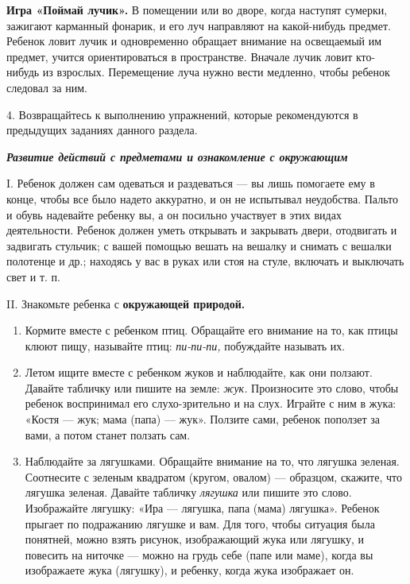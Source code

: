 \documentclass[a5paper]{book}
\renewcommand{\emph}[1]{\textit{#1}}
\begin{document}
\textbf{Игра «Поймай лучик».} В помещении или во дворе, когда наступят
сумерки, зажигают карманный фонарик, и его луч направляют на
какой-нибудь предмет. Ребенок ловит лучик и одновременно обращает
внимание на освещаемый им предмет, учится ориентироваться в
пространстве. Вначале лучик ловит кто-нибудь из взрослых. Перемещение
луча нужно вести медленно, чтобы ребенок следовал за ним.

4. Возвращайтесь к выполнению упражнений, которые рекомендуются в
предыдущих заданиях данного раздела.

\emph{\textbf{Развитие действий с предметами и ознакомление с
окружающим}}

I. Ребенок должен сам одеваться и раздеваться --- вы лишь помогаете ему
в конце, чтобы все было надето аккуратно, и он не испытывал неудобства.
Пальто и обувь надевайте ребенку вы, а он посильно участвует в этих
видах деятельности. Ребенок должен уметь открывать и закрывать двери,
отодвигать и задвигать стульчик; с вашей помощью вешать на вешалку и
снимать с вешалки полотенце и др.; находясь у вас в руках или стоя на
стуле, включать и выключать свет и т. п.

II. Знакомьте ребенка с \textbf{окружающей природой.}


\begin{enumerate}
\def\labelenumi{\arabic{enumi}.}
\item
  
  Кормите вместе с ребенком птиц. Обращайте его внимание на то, как
  птицы клюют пищу, называйте птиц: \emph{пи-пи-пи,} побуждайте называть
  их.
  
\item
  
  Летом ищите вместе с ребенком жуков и наблюдайте, как они ползают.
  Давайте табличку или пишите на земле: \emph{жук.} Произносите это
  слово, чтобы ребенок воспринимал его слухо-зрительно и на слух.
  Играйте с ним в жука: «Костя --- жук; мама (папа) --- жук». Ползите
  сами, ребенок поползет за вами, а потом станет ползать сам.
  
\item
  
  Наблюдайте за лягушками. Обращайте внимание на то, что лягушка
  зеленая. Соотнесите с зеленым квадратом (кругом, овалом) --- образцом,
  скажите, что лягушка зеленая. Давайте табличку \emph{лягушка} или
  пишите это слово. Изображайте лягушку: «Ира --- лягушка, папа (мама)
  лягушка». Ребенок прыгает по подражанию лягушке и вам. Для того, чтобы
  ситуация была понятней, можно взять рисунок, изображающий жука или
  лягушку, и повесить на ниточке --- можно на грудь себе (папе или
  маме), когда вы изображаете жука (лягушку), и ребенку, когда жука
  изображает он.
  
\end{enumerate}
\end{document}
